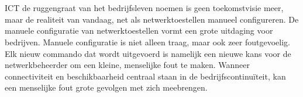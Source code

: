 
%
%
%
%
%

%



\chapter*{}
ICT de ruggengraat van het bedrijfsleven noemen is geen toekomstvisie meer, maar de realiteit van vandaag, net als netwerktoestellen manueel configureren.
De manuele configuratie van netwerktoestellen vormt een grote uitdaging voor bedrijven. Manuele configuratie is niet alleen traag, maar ook zeer foutgevoelig. Elk nieuw commando dat wordt uitgevoerd is namelijk een nieuwe kans voor de netwerkbeheerder om een kleine, menselijke fout te maken.
Wanneer connectiviteit en beschikbaarheid centraal staan in de bedrijfscontinuïteit, kan een menselijke fout grote gevolgen met zich meebrengen.
\vspace{1em}


